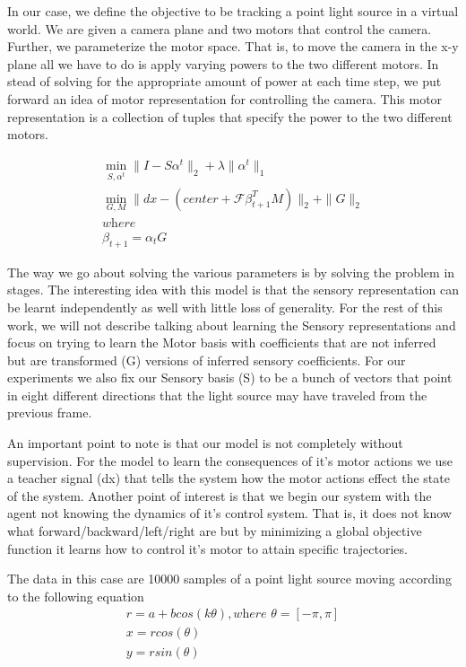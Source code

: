 \documentclass[conference]{IEEEtran}
\begin{document}
In our case, we define the objective to be tracking a point light source in a virtual world. We are given a camera plane and two motors that control the camera. Further, we parameterize the motor space. That is, to move the camera in the x-y plane all we have to do is apply varying powers to the two different motors. In stead of solving for the appropriate amount of power at each time step, we put forward an idea of motor representation for controlling the camera. This motor representation is a collection of tuples that specify the power to the two different motors. 

\begin{eqnarray}
\min_{S,\alpha^{t}} \| I - S\alpha^{t} \|_{2} + \lambda \| \alpha^{t} \|_{1}\\
\min_{G,M}  \| dx - (center + \mathcal{F} \beta_{t+1}^{T}M ) \|_{2} + \|G \|_{2}\\
\textit{where}\\
\beta_{t+1} = \alpha_{t} G
\end{eqnarray}


The way we go about solving the various parameters is by solving the problem in stages. The interesting idea with this model is that the sensory representation can be learnt independently as well with little loss of generality. For the rest of this work, we will not describe talking about learning the Sensory representations and focus on trying to learn the Motor basis with coefficients that are not inferred but are transformed (G) versions of inferred sensory coefficients. For our experiments we also fix our Sensory basis (S) to be a bunch of vectors that point in eight different directions that the light source may have traveled from the previous frame.

An important point to note is that our model is not completely without supervision. For the model to learn the consequences of it's motor actions we use a teacher signal (dx) that tells the system how the motor actions effect the state of the system. Another point of interest is that we begin our system with the agent not knowing the dynamics of it's control system. That is, it does not know what forward/backward/left/right are but by minimizing a global objective function it learns how to control it's motor to attain specific trajectories. 

The data in this case are 10000 samples of a point light source moving according to the following equation 
\begin{eqnarray}
r = a + b cos(k \theta),\textit{where } \theta = [ -\pi, \pi ] \\
x = r cos(\theta)\\
y = r sin(\theta)\\
\end{eqnarray}
\end{document}
